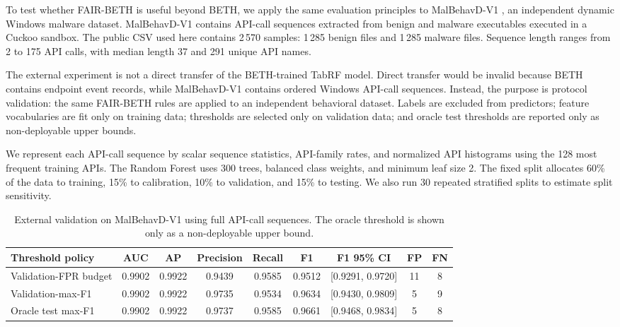 \documentclass[journal]{IEEEtran}
\begin{document}
To test whether FAIR-BETH is useful beyond BETH, we apply the same evaluation principles to MalBehavD-V1 \cite{maniriho2023,malbehavd2023}, an independent dynamic Windows malware dataset. MalBehavD-V1 contains API-call sequences extracted from benign and malware executables executed in a Cuckoo sandbox. The public CSV used here contains 2\,570 samples: 1\,285 benign files and 1\,285 malware files. Sequence length ranges from 2 to 175 API calls, with median length 37 and 291 unique API names.

The external experiment is not a direct transfer of the BETH-trained TabRF model. Direct transfer would be invalid because BETH contains endpoint event records, while MalBehavD-V1 contains ordered Windows API-call sequences. Instead, the purpose is protocol validation: the same FAIR-BETH rules are applied to an independent behavioral dataset. Labels are excluded from predictors; feature vocabularies are fit only on training data; thresholds are selected only on validation data; and oracle test thresholds are reported only as non-deployable upper bounds.

We represent each API-call sequence by scalar sequence statistics, API-family rates, and normalized API histograms using the 128 most frequent training APIs. The Random Forest uses 300 trees, balanced class weights, and minimum leaf size 2. The fixed split allocates 60\% of the data to training, 15\% to calibration, 10\% to validation, and 15\% to testing. We also run 30 repeated stratified splits to estimate split sensitivity.

\begin{table}[t]
\centering
\caption{External validation on MalBehavD-V1 using full API-call sequences. The oracle threshold is shown only as a non-deployable upper bound.}
\label{tab:malbehavd_external}
\begin{tabular}{lcccccccc}
\toprule
\textbf{Threshold policy} & \textbf{AUC} & \textbf{AP} & \textbf{Precision} & \textbf{Recall} & \textbf{F1} & \textbf{F1 95\% CI} & \textbf{FP} & \textbf{FN} \\
\midrule
Validation-FPR budget & 0.9902 & 0.9922 & 0.9439 & 0.9585 & 0.9512 & [0.9291, 0.9720] & 11 & 8 \\
Validation-max-F1 & 0.9902 & 0.9922 & 0.9735 & 0.9534 & 0.9634 & [0.9430, 0.9809] & 5 & 9 \\
Oracle test max-F1 & 0.9902 & 0.9922 & 0.9737 & 0.9585 & 0.9661 & [0.9468, 0.9834] & 5 & 8 \\
\bottomrule
\end{tabular}
\end{table}
\end{document}
